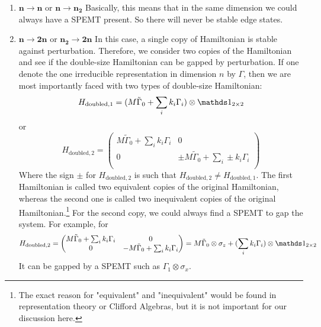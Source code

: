 \begin{enumerate}
    \item $\mathbf{n\to n}$ or $\mathbf{n\to n_2}$ Basically, this means that in
        the same dimension we could always have a SPEMT present. So there will
        never be stable edge states.
    \item 
    $\mathbf{n\to 2n}$ or $\mathbf{n_2\to 2n}$ In this case, a single copy of
    Hamiltonian is stable against perturbation. Therefore, we consider two copies of
    the Hamiltonian and see if the double-size Hamiltonian can be gapped by
    perturbation. If one denote the one irreducible representation in dimension $n$
    by $\Gamma$, then we are most importantly faced with two types of double-size
    Hamiltonian:
    \begin{equation}
        H_\mathrm{doubled,1} = (M\tilde{\Gamma}_0 + \sum_i k_i\Gamma_i
        )\otimes\id_{2\times 2}
    \end{equation}
    or
    \begin{equation}
        H_\mathrm{doubled,2} = \begin{pmatrix}
            M\tilde{\Gamma}_0 + \sum_i k_i\Gamma_i & 0 \\
            0 & \pm M\tilde{\Gamma}_0 + \sum_i \pm k_i\Gamma_i \\
        \end{pmatrix}
    \end{equation}
    Where the sign $\pm$ for $H_\mathrm{doubled,2}$ is such that
    $H_\mathrm{doubled,2}\neq H_\mathrm{doubled,1}$.  The first Hamiltonian is
    called two equivalent copies of the original Hamiltonian, whereas the second one
    is called two inequivalent copies of the original Hamiltonian.\footnote{The
    exact reason for "equivalent" and "inequivalent" would be found in
    representation theory or Clifford Algebras, but it is not important for
    our discussion here.} For the second copy, we could always find a SPEMT to gap
    the system. For example, for
    \begin{equation}
        H_\mathrm{doubled,2} = \begin{pmatrix}
            M\tilde{\Gamma}_0 + \sum_i k_i\Gamma_i & 0 \\
            0 & - M\tilde{\Gamma}_0 + \sum_i k_i\Gamma_i \\
        \end{pmatrix} =
        M\tilde{\Gamma}_0\otimes\sigma_z + 
            (\sum_i k_i\Gamma_i)\otimes\id_{2\times 2}
    \end{equation}
    It can be gapped by a SPEMT such as $\Gamma_1\otimes \sigma_x$. 


\end{enumerate}

